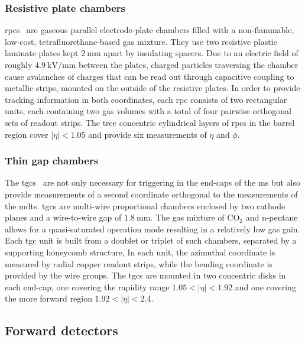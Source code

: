 \subsubsection{Resistive plate chambers}

\glspl{rpc}~\cite{Aad:2008zzm} are gaseous parallel electrode-plate chambers filled with a non-flammable, low-cost, tetrafluorethane-based gas mixture. They use two resistive plastic laminate plates kept $\SI{2}{\milli\meter}$ apart by insulating spacers. Due to an electric field of roughly $\SI{4.9}{\kilo\volt\per\milli\meter}$ between the plates, charged particles traversing the chamber cause avalanches of charges that can be read out through capacitive coupling to metallic strips, mounted on the outside of the resistive plates. In order to provide tracking information in both coordinates, each \gls{rpc} consists of two rectangular units, each containing two gas volumes with a total of four pairwise orthogonal sets of readout strips. The tree concentric cylindrical layers of \glspl{rpc} in the barrel region cover $\vert\eta\vert <1.05$ and provide six measurements of $\eta$ and $\phi$. %

\subsubsection{Thin gap chambers}

The \glspl{tgc}~\cite{Aad:2008zzm} are not only necessary for triggering in the end-caps of the \gls{ms} but also provide measurements of a second coordinate orthogonal to the measurements of the \glspl{mdt}. \glspl{tgc} are multi-wire proportional chambers enclosed by two cathode planes and a wire-to-wire gap of $\SI{1.8}{\milli\meter}$. The gas mixture of CO$_2$ and n-pentane allows for a quasi-saturated operation mode resulting in a relatively low gas gain. Each \gls{tgc} unit is built from a doublet or triplet of such chambers, separated by a supporting honeycomb structure, In each unit, the azimuthal coordinate is measured by radial copper readout strips, while the bending coordinate is provided by the wire groups. The \glspl{tgc} are mounted in two concentric disks in each end-cap, one covering the rapidity range $1.05 < \vert\eta\vert < 1.92$ and one covering the more forward region $1.92 < \vert\eta\vert <2.4$. 

\subsection{Forward detectors}

